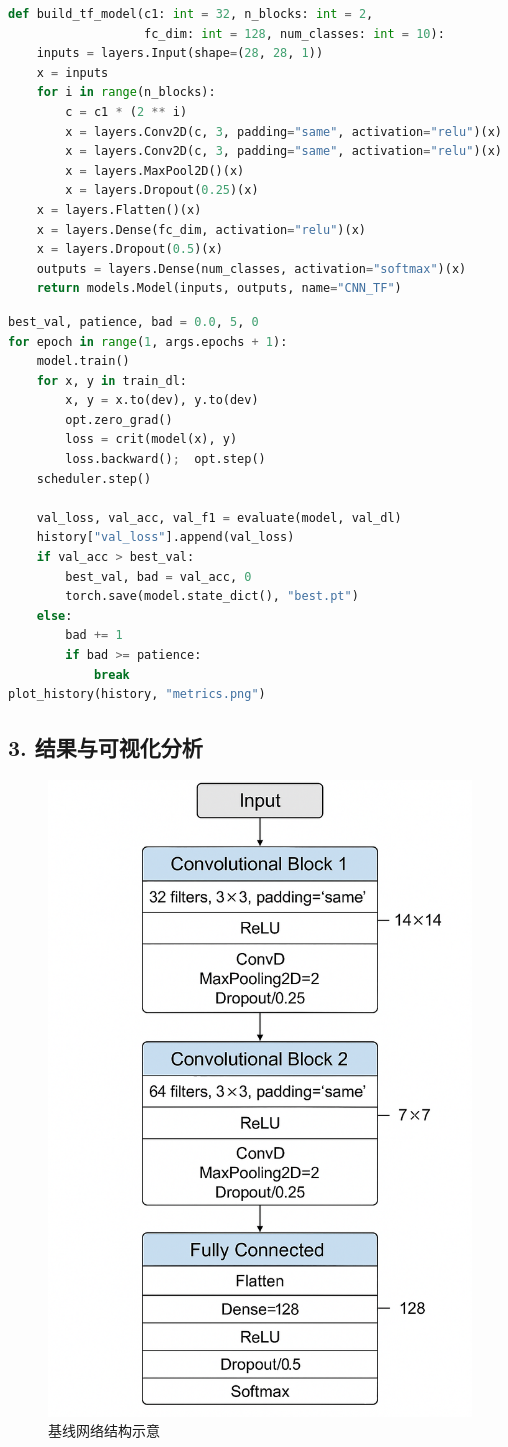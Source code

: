\documentclass[UTF8]{article}
\begin{document}
\begin{lstlisting}[language=Python, caption=TensorFlow 版本模型构建, label=code:cnn_tf]
def build_tf_model(c1: int = 32, n_blocks: int = 2,
                   fc_dim: int = 128, num_classes: int = 10):
    inputs = layers.Input(shape=(28, 28, 1))
    x = inputs
    for i in range(n_blocks):
        c = c1 * (2 ** i)
        x = layers.Conv2D(c, 3, padding="same", activation="relu")(x)
        x = layers.Conv2D(c, 3, padding="same", activation="relu")(x)
        x = layers.MaxPool2D()(x)
        x = layers.Dropout(0.25)(x)
    x = layers.Flatten()(x)
    x = layers.Dense(fc_dim, activation="relu")(x)
    x = layers.Dropout(0.5)(x)
    outputs = layers.Dense(num_classes, activation="softmax")(x)
    return models.Model(inputs, outputs, name="CNN_TF")
\end{lstlisting}

\begin{lstlisting}[language=Python, caption=关键训练循环（PyTorch）, label=code:train_loop]
best_val, patience, bad = 0.0, 5, 0
for epoch in range(1, args.epochs + 1):
    model.train()
    for x, y in train_dl:
        x, y = x.to(dev), y.to(dev)
        opt.zero_grad()
        loss = crit(model(x), y)
        loss.backward();  opt.step()
    scheduler.step()

    val_loss, val_acc, val_f1 = evaluate(model, val_dl)
    history["val_loss"].append(val_loss)
    if val_acc > best_val:
        best_val, bad = val_acc, 0
        torch.save(model.state_dict(), "best.pt")
    else:
        bad += 1
        if bad >= patience:
            break
plot_history(history, "metrics.png")
\end{lstlisting}

\subsection*{3. 结果与可视化分析}
\begin{figure}[H]
    \centering
    \includegraphics[width=.45\linewidth]{network.png}
    \caption{基线网络结构示意}
    \label{fig:network}
\end{figure}
\end{document}
